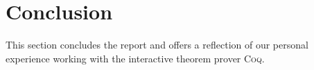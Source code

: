 \section{Conclusion}

This section concludes the report and offers a reflection of our personal experience working with the interactive theorem prover \textsc{Coq}.